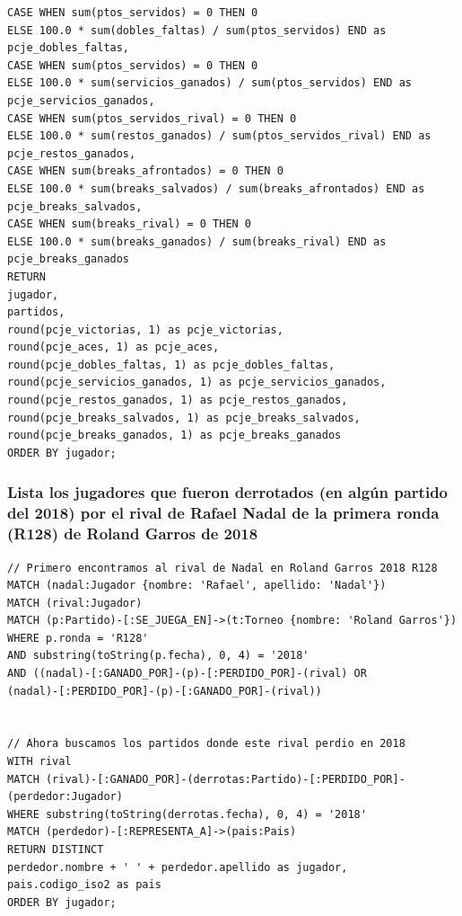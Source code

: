\documentclass[11pt]{opticajnl}
\begin{document}
\begin{lstlisting}[language=Cypher]
CASE WHEN sum(ptos_servidos) = 0 THEN 0
ELSE 100.0 * sum(dobles_faltas) / sum(ptos_servidos) END as pcje_dobles_faltas,
CASE WHEN sum(ptos_servidos) = 0 THEN 0
ELSE 100.0 * sum(servicios_ganados) / sum(ptos_servidos) END as pcje_servicios_ganados,
CASE WHEN sum(ptos_servidos_rival) = 0 THEN 0
ELSE 100.0 * sum(restos_ganados) / sum(ptos_servidos_rival) END as pcje_restos_ganados,
CASE WHEN sum(breaks_afrontados) = 0 THEN 0
ELSE 100.0 * sum(breaks_salvados) / sum(breaks_afrontados) END as pcje_breaks_salvados,
CASE WHEN sum(breaks_rival) = 0 THEN 0
ELSE 100.0 * sum(breaks_ganados) / sum(breaks_rival) END as pcje_breaks_ganados
RETURN
jugador,
partidos,
round(pcje_victorias, 1) as pcje_victorias,
round(pcje_aces, 1) as pcje_aces,
round(pcje_dobles_faltas, 1) as pcje_dobles_faltas,
round(pcje_servicios_ganados, 1) as pcje_servicios_ganados,
round(pcje_restos_ganados, 1) as pcje_restos_ganados,
round(pcje_breaks_salvados, 1) as pcje_breaks_salvados,
round(pcje_breaks_ganados, 1) as pcje_breaks_ganados
ORDER BY jugador;
\end{lstlisting}





\subsubsection{Lista los jugadores que fueron derrotados (en algún partido del 2018) por el rival de Rafael Nadal de la primera ronda (R128) de Roland Garros de 2018}

\begin{lstlisting}[language=Cypher]
// Primero encontramos al rival de Nadal en Roland Garros 2018 R128
MATCH (nadal:Jugador {nombre: 'Rafael', apellido: 'Nadal'})
MATCH (rival:Jugador)
MATCH (p:Partido)-[:SE_JUEGA_EN]->(t:Torneo {nombre: 'Roland Garros'})
WHERE p.ronda = 'R128'
AND substring(toString(p.fecha), 0, 4) = '2018'
AND ((nadal)-[:GANADO_POR]-(p)-[:PERDIDO_POR]-(rival) OR
(nadal)-[:PERDIDO_POR]-(p)-[:GANADO_POR]-(rival))


// Ahora buscamos los partidos donde este rival perdio en 2018
WITH rival
MATCH (rival)-[:GANADO_POR]-(derrotas:Partido)-[:PERDIDO_POR]-(perdedor:Jugador)
WHERE substring(toString(derrotas.fecha), 0, 4) = '2018'
MATCH (perdedor)-[:REPRESENTA_A]->(pais:Pais)
RETURN DISTINCT
perdedor.nombre + ' ' + perdedor.apellido as jugador,
pais.codigo_iso2 as pais
ORDER BY jugador;
\end{lstlisting}
    
    
\end{document}
